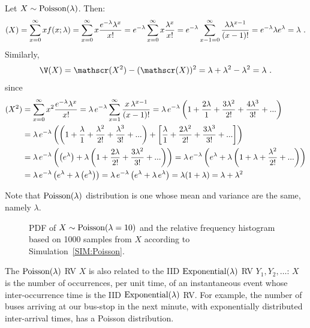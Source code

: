 \begin{example}\label{EgMeanAndVarOfPoisson}
Let $X \sim \mbox{{\rm Poisson}}(\lambda)$.  Then:
\[
\mathscr{(}X) = \sum_{x=0}^{\infty} x f(x;\lambda)
= \sum_{x =0}^{\infty} x \frac{ e^{-\lambda} \lambda^x}{x!}
= e^{-\lambda} \sum_{x =0}^{\infty} x \frac{  \lambda^x}{x!}
= e^{-\lambda} \sum_{x -1 =0}^{\infty} \frac{ \lambda \lambda^{x-1}}{(x-1)!}
= e^{-\lambda} \lambda e^{\lambda}
= \lambda
\ .
\]
Similarly,
\[
\V(X) = \E(X^2)-(\E(X))^2 = \lambda + \lambda^2 - \lambda^2 = \lambda \ .
\]
since
\begin{align*}
\mathscr{(}X^2)& = \sum_{x=0}^{\infty} x^2 \frac{e^{-\lambda} \lambda^x}{x!} = \lambda \, e^{-\lambda} \sum_{x=1}^{\infty} \frac{x \, \lambda^{x-1}}{(x-1)!}
= \lambda \, e^{-\lambda} \left( 1 + \frac{2 \lambda}{1} + \frac{3 \lambda^2}{2!} + \frac{4 \lambda^3}{3!} + ... \right)\\
&= \lambda \, e^{-\lambda} \left( \left( 1 + \frac{\lambda}{1} + \frac{\lambda^2}{2!} + \frac{\lambda^3}{3!} + ... \right) + \left[ \frac{\lambda}{1} + \frac{2 \lambda^2}{2!} + \frac{3 \lambda^3}{3!} + ... \right] \right)\\
&= \lambda \, e^{-\lambda} \left( \left( e^{\lambda} \right) + \lambda \left( 1 + \frac{2 \lambda}{2!} + \frac{3 \lambda^2}{3!} + ... \right) \right)
= \lambda \, e^{-\lambda} \left( e^{\lambda} + \lambda \left( 1 + \lambda + \frac{\lambda^2}{2!} + ... \right) \right)\\
&= \lambda \, e^{-\lambda} \left( e^{\lambda} + \lambda \left( e^{\lambda} \right) \right)
= \lambda \, e^{-\lambda} \left( e^{\lambda} + \lambda\, e^{\lambda}\right) = \lambda (1 + \lambda) = \lambda + \lambda^2
\end{align*}

Note that $\mbox{{\rm Poisson}}(\lambda)$ distribution is one whose mean and variance are the same, namely $\lambda$.
\end{example}

\begin{figure}[htpb]
\caption{PDF of $X \sim \mbox{{\rm Poisson}}(\lambda=10)$ and the relative frequency histogram based on 1000 samples from $X$ according to Simulation~\ref{SIM:Poisson}.\label{F:PlotPdfSim1000HistPoiss10}}
\centering   {}
\end{figure}

The $\mbox{{\rm Poisson}}(\lambda)$ RV $X$ is also related to the IID $\mbox{{\rm Exponential}}(\lambda)$ RV $Y_1,Y_2,\ldots$: $X$ is the number of occurrences, per unit time, of an instantaneous event whose inter-occurrence time is the IID $\mbox{{\rm Exponential}}(\lambda)$ RV.  For example, the number of buses arriving at our bus-stop in the next minute, with exponentially distributed inter-arrival times, has a Poisson distribution.

